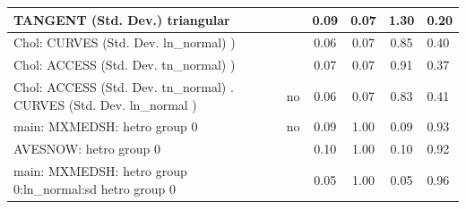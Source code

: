 \begin{table}
\begin{center}
\begin{tabular}{|l|l|c|c|c|l|}
			\hline
			TANGENT (Std. Dev.) triangular &  & 0.09 & 0.07 & 1.30 & 0.20 \\
			\hline
			 Chol: CURVES (Std. Dev. ln_normal) ) &  & 0.06 & 0.07 & 0.85 & 0.40 \\
			\hline
			 Chol: ACCESS (Std. Dev. tn_normal) ) &  & 0.07 & 0.07 & 0.91 & 0.37 \\
			\hline
			 Chol: ACCESS (Std. Dev. tn_normal) . CURVES (Std. Dev.   ln_normal ) & no & 0.06 & 0.07 & 0.83 & 0.41 \\
			\hline
			main: MXMEDSH: hetro group 0 & no & 0.09 & 1.00 & 0.09 & 0.93 \\
			\hline
			AVESNOW: hetro group 0 &  & 0.10 & 1.00 & 0.10 & 0.92 \\
			\hline
			main: MXMEDSH: hetro group 0:ln_normal:sd  hetro group 0 &  & 0.05 & 1.00 & 0.05 & 0.96 \\
			\hline
		\end{tabular}
	\end{center}
\end{table}